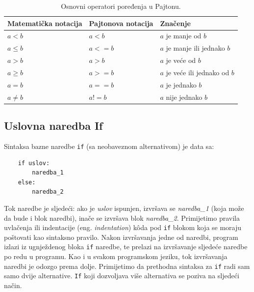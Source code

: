 
\begin{table}
		\caption{Osnovni operatori poređenja u Pajtonu.}	\label{fig: operatori_poredjenja}
		\hline
	\begin{tabular}{lll}
		Matematička notacija & Pajtonova notacija & Značenje \\ \hline
		$a < b$              &  $a < b$           & $a$ je manje od $b$ \\
		 $a \leq b$          &  $a <= b$          &$ a$ je manje ili jednako $b$ \\  
		 $a > b$             &   $a >b$           & $a$ je veće od $b$   \\
		 $a \geq b$          &   $a >= b$         & $a$ je veće ili jednako od $b$   \\
		 $a=b$               &   $a==b$           & $a$ je jednako $b$               \\
		 $a \neq b$          & $a!=b$             &  $a$ nije jednako $b$            \\ \hline    
  	\end{tabular} 
\end{table}

\subsection{Uslovna naredba If}

Sintaksa bazne naredbe \texttt{if} (sa neobaveznom alternativom) je data sa:
\begin{verbatim}
    if uslov:
        naredba_1
    else:
        naredba_2
\end{verbatim}

Tok naredbe je sljedeći: ako je \emph{uslov} ispunjen, izvršava se \textit{naredba\_1} (koja može da bude i blok naredbi), inače se izvršava blok \textit{naredba\_2}. Primijetimo pravila uvlačenja ili indentacije (eng. \textit{indentation}) k\^oda pod \texttt{if} blokom koja se moraju poštovati kao sintaksno pravilo. Nakon izvršavanja jedne od naredbi, program izlazi iz ugnježdenog bloka \texttt{if} naredbe, te prelazi na izvršavanje sljedeće naredbe po redu u programu. Kao i u svakom programskom jeziku, tok izvršavanja naredbi je  odozgo prema dolje. Primijetimo da prethodna sintaksa za \texttt{if} radi sam samo dvije alternative. \texttt{If} koji dozvoljava više alternativa se poziva na sljedeći način. 

